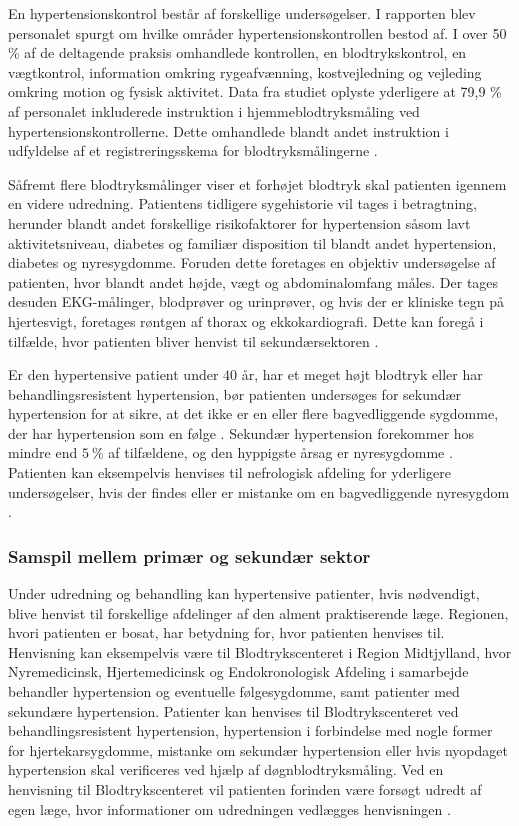 En hypertensionskontrol består af forskellige  undersøgelser. I rapporten  blev personalet spurgt om hvilke områder hypertensionskontrollen bestod af. I over 50 \% af de deltagende praksis omhandlede kontrollen, en blodtrykskontrol, en vægtkontrol, information omkring rygeafvænning, kostvejledning og vejleding omkring motion og fysisk aktivitet. Data fra studiet oplyste yderligere at 79,9 \% af personalet inkluderede instruktion i hjemmeblodtryksmåling ved hypertensionskontrollerne. Dette omhandlede blandt andet instruktion i udfyldelse af et registreringsskema for blodtryksmålingerne \citep{munck2007}. 

Såfremt flere blodtryksmålinger viser et forhøjet blodtryk skal patienten igennem en videre udredning. Patientens tidligere sygehistorie vil tages i betragtning, herunder blandt andet forskellige risikofaktorer for hypertension såsom lavt aktivitetsniveau, diabetes og familiær disposition til blandt andet hypertension, diabetes og nyresygdomme. Foruden dette foretages en objektiv undersøgelse af patienten, hvor blandt andet højde, vægt og abdominalomfang måles. Der tages desuden EKG-målinger, blodprøver og urinprøver, og hvis der er kliniske tegn på hjertesvigt, foretages røntgen af thorax og ekkokardiografi. Dette kan foregå i tilfælde, hvor patienten bliver henvist til sekundærsektoren \citep{lodberg2016, bech2015}.

Er den hypertensive patient under $40$ år, har et meget højt blodtryk eller har behandlingsresistent hypertension, bør patienten undersøges for sekundær hypertension for at sikre, at det ikke er en eller flere bagvedliggende sygdomme, der har hypertension som en følge \citep{lodberg2016}. Sekundær hypertension forekommer hos mindre end $5~\%$ af tilfældene, og den hyppigste årsag er nyresygdomme \citep{lodberg2008}. Patienten kan eksempelvis henvises til nefrologisk afdeling for yderligere undersøgelser, hvis der findes eller er mistanke om en bagvedliggende nyresygdom \citep{lodberg2016, sundhedsstyrelsen2010}. 

\subsubsection{Samspil mellem primær og sekundær sektor}
Under udredning og behandling kan hypertensive patienter, hvis nødvendigt, blive henvist til forskellige afdelinger af den alment praktiserende læge. Regionen, hvori patienten er bosat, har betydning for, hvor patienten henvises til. Henvisning kan eksempelvis være til Blodtrykscenteret i Region Midtjylland, hvor Nyremedicinsk, Hjertemedicinsk og Endokronologisk Afdeling i samarbejde behandler hypertension og eventuelle følgesygdomme, samt patienter med sekundære hypertension. Patienter kan henvises til Blodtrykscenteret ved behandlingsresistent hypertension, hypertension i forbindelse med nogle former for hjertekarsygdomme, mistanke om sekundær hypertension eller hvis nyopdaget hypertension skal verificeres ved hjælp af døgnblodtryksmåling. Ved en henvisning til Blodtrykscenteret vil patienten forinden være forsøgt udredt af egen læge, hvor informationer om udredningen vedlægges henvisningen \citep{aarhusuniversitetshospital}. 

